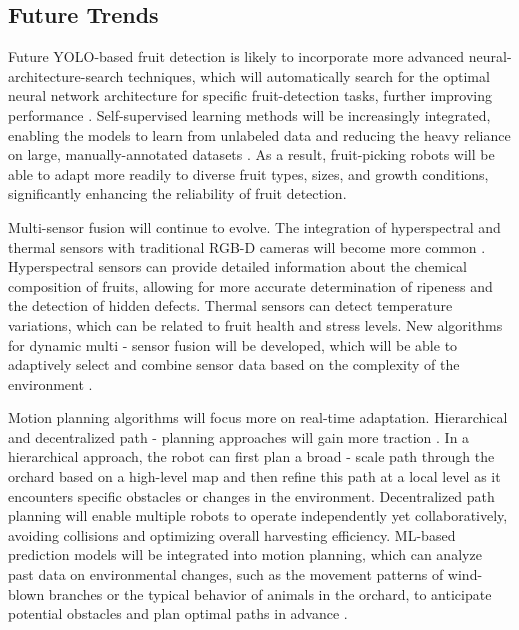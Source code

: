 \documentclass[a4paper,fleqn]{cas-dc}
\begin{document}
\subsection{ Future Trends}
Future YOLO-based fruit detection is likely to incorporate more advanced neural-architecture-search techniques, which will automatically search for the optimal neural network architecture for specific fruit-detection tasks, further improving performance \cite{hou2023overview, suresh2023selective}. Self-supervised learning methods will be increasingly integrated, enabling the models to learn from unlabeled data and reducing the heavy reliance on large, manually-annotated datasets \cite{suresh2023selective, zhang2024automatic}. As a result, fruit-picking robots will be able to adapt more readily to diverse fruit types, sizes, and growth conditions, significantly enhancing the reliability of fruit detection.

Multi-sensor fusion will continue to evolve. The integration of hyperspectral and thermal sensors with traditional RGB-D cameras will become more common \cite{mohamed2021smart, martos2021ensuring}. Hyperspectral sensors can provide detailed information about the chemical composition of fruits, allowing for more accurate determination of ripeness and the detection of hidden defects. Thermal sensors can detect temperature variations, which can be related to fruit health and stress levels. New algorithms for dynamic multi - sensor fusion will be developed, which will be able to adaptively select and combine sensor data based on the complexity of the environment \cite{liu2024hierarchical}.

Motion planning algorithms will focus more on real-time adaptation. Hierarchical and decentralized path - planning approaches will gain more traction \cite{lytridis2021overview, li2023multi}. In a hierarchical approach, the robot can first plan a broad - scale path through the orchard based on a high-level map and then refine this path at a local level as it encounters specific obstacles or changes in the environment. Decentralized path planning will enable multiple robots to operate independently yet collaboratively, avoiding collisions and optimizing overall harvesting efficiency. ML-based prediction models will be integrated into motion planning, which can analyze past data on environmental changes, such as the movement patterns of wind-blown branches or the typical behavior of animals in the orchard, to anticipate potential obstacles and plan optimal paths in advance \cite{rajendran2024towards}.
\end{document}
